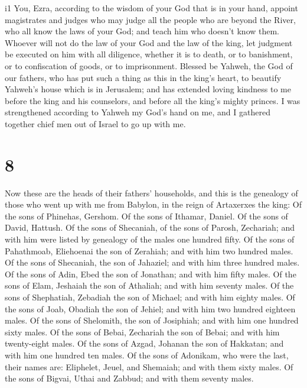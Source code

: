 i1 You, Ezra, according to the wisdom of your God that is
in your hand, appoint magistrates and judges who may judge all the
people who are beyond the River, who all know the laws of your God; and
teach him who doesn't know them.  Whoever will not do the
law of your God and the law of the king, let judgment be executed on him
with all diligence, whether it is to death, or to banishment, or to
confiscation of goods, or to imprisonment.  Blessed be
Yahweh, the God of our fathers, who has put such a thing as this in the
king's heart, to beautify Yahweh's house which is in Jerusalem;
 and has extended loving kindness to me before the king and
his counselors, and before all the king's mighty princes. I was
strengthened according to Yahweh my God's hand on me, and I gathered
together chief men out of Israel to go up with me.

\hypertarget{section-7}{%
\section{8}\label{section-7}}

 Now these are the heads of their fathers' households, and
this is the genealogy of those who went up with me from Babylon, in the
reign of Artaxerxes the king:  Of the sons of Phinehas,
Gershom. Of the sons of Ithamar, Daniel. Of the sons of David, Hattush.
 Of the sons of Shecaniah, of the sons of Parosh, Zechariah;
and with him were listed by genealogy of the males one hundred fifty.
 Of the sons of Pahathmoab, Eliehoenai the son of Zerahiah;
and with him two hundred males.  Of the sons of Shecaniah,
the son of Jahaziel; and with him three hundred males.  Of
the sons of Adin, Ebed the son of Jonathan; and with him fifty males.
 Of the sons of Elam, Jeshaiah the son of Athaliah; and with
him seventy males.  Of the sons of Shephatiah, Zebadiah the
son of Michael; and with him eighty males.  Of the sons of
Joab, Obadiah the son of Jehiel; and with him two hundred eighteen
males.  Of the sons of Shelomith, the son of Josiphiah; and
with him one hundred sixty males.  Of the sons of Bebai,
Zechariah the son of Bebai; and with him twenty-eight males.
 Of the sons of Azgad, Johanan the son of Hakkatan; and
with him one hundred ten males.  Of the sons of Adonikam,
who were the last, their names are: Eliphelet, Jeuel, and Shemaiah; and
with them sixty males.  Of the sons of Bigvai, Uthai and
Zabbud; and with them seventy males.

